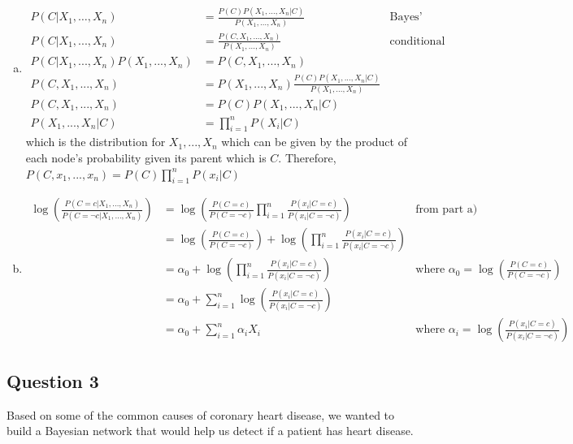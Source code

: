 \documentclass{article}
\begin{document}
\begin{enumerate}[a)]
\item
\begin{align*}
P(C | X_1, \ldots , X_n) &= \frac{P(C) P(X_1, \ldots , X_n | C)}{P(X_1, \ldots , X_n)} & \text{Bayes' Theorem} \\
P(C | X_1, ... , X_n) &= \frac{P(C, X_1, ... , X_n)}{P(X_1, ... , X_n)} & \text{conditional probability} \\
P(C | X_1, ... , X_n) P(X_1, ... , X_n) &= P(C, X_1, ... , X_n) \\
P(C, X_1, ... , X_n) &=  P(X_1, ... , X_n) \frac{P(C) P(X_1, ... , X_n | C)}{P(X_1, ... , X_n)} \\
P(C, X_1, ... , X_n) &=  P(C) P(X_1, ... , X_n | C) \\ 
P(X_1, ... , X_n | C) &=  \prod_{i=1}^n P(X_i | C) 
\end{align*}
which is the distribution for $X_1, ..., X_n$ which can be given by the product of each node's probability given its parent which is $C$.
Therefore,
$P(C, x_1, ... , x_n) =  P(C) \prod_{i=1}^n P(x_i | C) $
\item
\begin{align*}
\log{\left(\frac{P(C = c | X_1, \ldots, X_n)}{P(C = \neg c | X_1, \ldots, X_n)}\right)} &= \log{\left(\frac{P(C=c)}{P(C=\neg c)} \prod_{i=1}^n \frac{P(x_i | C = c)}{P(x_i | C = \neg c)}\right)} & \text{from part a)} \\
&= \log{\left(\frac{P(C=c)}{P(C=\neg c)}\right)} + \log{\left(\prod_{i=1}^n \frac{P(x_i | C = c)}{P(x_i | C = \neg c)}\right)} \\
&= \alpha_0 + \log{\left(\prod_{i=1}^n \frac{P(x_i | C = c)}{P(x_i | C = \neg c)}\right)} & \text{where } \alpha_0 = \log{\left(\frac{P(C=c)}{P(C=\neg c)}\right)} \\
&= \alpha_0 + \sum_{i=1}^n \log{\left(\frac{P(x_i | C = c)}{P(x_i | C = \neg c)}\right)} \\
&= \alpha_0 + \sum_{i=1}^n \alpha_i X_i & \text{where } \alpha_i = \log{\left(\frac{P(x_i | C = c)}{P(x_i | C = \neg c)}\right)}
\end{align*}
\end{enumerate}

\subsection{Question 3}
Based on some of the common causes of coronary heart disease, we wanted to build a Bayesian network that would help us detect if a patient has heart disease.
\end{document}
